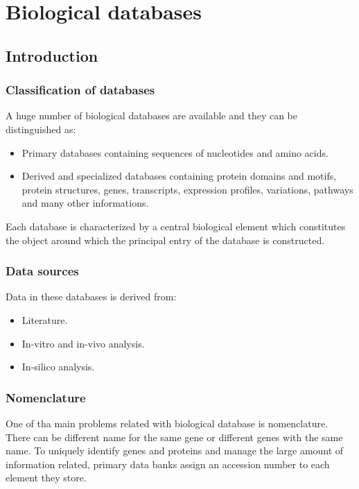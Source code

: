 \graphicspath{{chapters/03/images}}
\chapter{Biological databases}

\section{Introduction}

	\subsection{Classification of databases}
	A huge number of biological databases are available and they can be distinguished as:

	\begin{multicols}{2}
		\begin{itemize}
			\item Primary databases containing sequences of nucleotides and amino acids.
			\item Derived and specialized databases containing protein domains and motifs, protein structures, genes, transcripts, expression profiles, variations, pathways and many other informations.
		\end{itemize}
	\end{multicols}

	Each database is characterized by a central biological element which constitutes the object around which the principal entry of the database is constructed.

	\subsection{Data sources}
	Data in these databases is derived from:

	\begin{multicols}{3}
		\begin{itemize}
			\item Literature.
			\item In-vitro and in-vivo analysis.
			\item In-silico analysis.
		\end{itemize}
	\end{multicols}

	\subsection{Nomenclature}
	One of tha main problems related with biological database is nomenclature.
	There can be different name for the same gene or different genes with the same name.
	To uniquely identify genes and proteins and manage the large amount of information related, primary data banks assign an accession number to each element they store.

